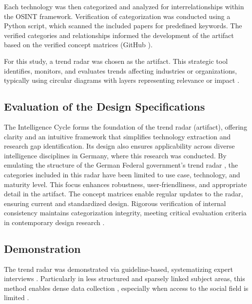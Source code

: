 \documentclass[10pt]{article}
\begin{document}

Each technology was then categorized and analyzed for interrelationships within the OSINT framework. Verification of categorization was conducted using a Python script, which scanned the included papers for predefined keywords. The verified categories and relationships informed the development of the artifact based on the verified concept matrices (GitHub \cite{kayser2024}).

For this study, a trend radar was chosen as the artifact. This strategic tool identifies, monitors, and evaluates trends affecting industries or organizations, typically using circular diagrams with layers representing relevance or impact \cite{wulfmettbrenn2017}.

\subsection{Evaluation of the Design Specifications}
The Intelligence Cycle forms the foundation of the trend radar (artifact), offering clarity and an intuitive framework that simplifies technology extraction and research gap identification. Its design also ensures applicability across diverse intelligence disciplines in Germany, where this research was conducted. By emulating the structure of the German Federal government's trend radar \cite{Stich.2022}, the categories included in this radar have been limited to use case, technology, and maturity level. This focus enhances robustness, user-friendliness, and appropriate detail in the artifact. The concept matrices enable regular updates to the radar, ensuring current and standardized design. Rigorous verification of internal consistency maintains categorization integrity, meeting critical evaluation criteria in contemporary design research \cite{vomBrocke.2020b}.


\subsection{Demonstration}
The trend radar was demonstrated via guideline-based, systematizing expert interviews \cite{Bogner.2014, Glaser.2009, Meuser.1991}. Particularly in less structured and sparsely linked subject areas, this method enables dense data collection \cite{Bogner.2014, Meuser.1991}, especially when access to the social field is limited \cite{Bogner.2002c, Glaser.2009}.
\end{document}
